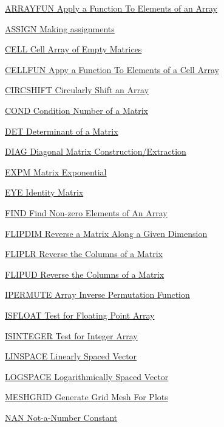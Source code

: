 
\begin{DoxyItemize}
\item \hyperlink{array_arrayfun}{A\-R\-R\-A\-Y\-F\-U\-N Apply a Function To Elements of an Array}  
\item \hyperlink{array_assign}{A\-S\-S\-I\-G\-N Making assignments}  
\item \hyperlink{array_cell}{C\-E\-L\-L Cell Array of Empty Matrices}  
\item \hyperlink{array_cellfun}{C\-E\-L\-L\-F\-U\-N Appy a Function To Elements of a Cell Array}  
\item \hyperlink{array_circshift}{C\-I\-R\-C\-S\-H\-I\-F\-T Circularly Shift an Array}  
\item \hyperlink{array_cond}{C\-O\-N\-D Condition Number of a Matrix}  
\item \hyperlink{array_det}{D\-E\-T Determinant of a Matrix}  
\item \hyperlink{array_diag}{D\-I\-A\-G Diagonal Matrix Construction/\-Extraction}  
\item \hyperlink{array_expm}{E\-X\-P\-M Matrix Exponential}  
\item \hyperlink{array_eye}{E\-Y\-E Identity Matrix}  
\item \hyperlink{array_find}{F\-I\-N\-D Find Non-\/zero Elements of An Array}  
\item \hyperlink{array_flipdim}{F\-L\-I\-P\-D\-I\-M Reverse a Matrix Along a Given Dimension}  
\item \hyperlink{array_fliplr}{F\-L\-I\-P\-L\-R Reverse the Columns of a Matrix}  
\item \hyperlink{array_flipud}{F\-L\-I\-P\-U\-D Reverse the Columns of a Matrix}  
\item \hyperlink{array_ipermute}{I\-P\-E\-R\-M\-U\-T\-E Array Inverse Permutation Function}  
\item \hyperlink{array_isfloat}{I\-S\-F\-L\-O\-A\-T Test for Floating Point Array}  
\item \hyperlink{array_isinteger}{I\-S\-I\-N\-T\-E\-G\-E\-R Test for Integer Array}  
\item \hyperlink{array_linspace}{L\-I\-N\-S\-P\-A\-C\-E Linearly Spaced Vector}  
\item \hyperlink{array_logspace}{L\-O\-G\-S\-P\-A\-C\-E Logarithmically Spaced Vector}  
\item \hyperlink{array_meshgrid}{M\-E\-S\-H\-G\-R\-I\-D Generate Grid Mesh For Plots}  
\item \hyperlink{array_nan}{N\-A\-N Not-\/a-\/\-Number Constant}  

\end{DoxyItemize}
